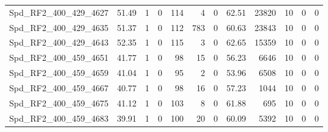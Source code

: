 \begin{longtable}[c]{@{}lrrrrrrrrrrr@{}}
Spd\_RF2\_400\_429\_4627     & 51.49                  & 1                       & 0                       & 114                    & 4                       & 0                       & 62.51                   & 23820                    & 10                       & 0                        & 0                        \\
Spd\_RF2\_400\_429\_4635     & 51.37                  & 1                       & 0                       & 112                    & 783                     & 0                       & 60.63                   & 23843                    & 10                       & 0                        & 0                        \\
Spd\_RF2\_400\_429\_4643     & 52.35                  & 1                       & 0                       & 115                    & 3                       & 0                       & 62.65                   & 15359                    & 10                       & 0                        & 0                        \\
Spd\_RF2\_400\_459\_4651     & 41.77                  & 1                       & 0                       & 98                     & 15                      & 0                       & 56.23                   & 6646                     & 10                       & 0                        & 0                        \\
Spd\_RF2\_400\_459\_4659     & 41.04                  & 1                       & 0                       & 95                     & 2                       & 0                       & 53.96                   & 6508                     & 10                       & 0                        & 0                        \\
Spd\_RF2\_400\_459\_4667     & 40.77                  & 1                       & 0                       & 98                     & 16                      & 0                       & 57.23                   & 1044                     & 10                       & 0                        & 0                        \\
Spd\_RF2\_400\_459\_4675     & 41.12                  & 1                       & 0                       & 103                    & 8                       & 0                       & 61.88                   & 695                      & 10                       & 0                        & 0                        \\
Spd\_RF2\_400\_459\_4683     & 39.91                  & 1                       & 0                       & 100                    & 20                      & 0                       & 60.09                   & 5392                     & 10                       & 0                        & 0                        \\

\end{longtable}
